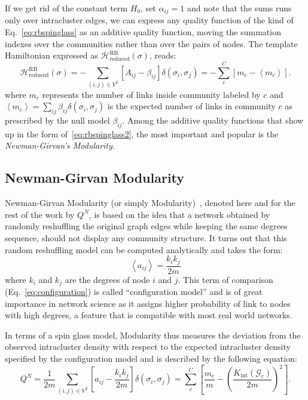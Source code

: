 If we get rid of the constant term $H_0$, set $\alpha_{ij}=1$ and note that the sums runs only over intracluster edges, we can express any quality function of the kind of Eq.~\ref{eq:rbspinglass} as an additive quality function, moving the summation indexes over the communities rather than over the pairs of nodes. The template Hamiltonian expressed as $\mathcal{H}^{\textrm{RB}}_{\textrm{reduced}}(\sigma)$, reads:
\begin{equation}\label{eq:rbspinglass2}
\mathcal{H}^{\textrm{RB}}_{\textrm{reduced}}(\sigma) = -\sum_{(i,j) \in V^2} \left[ A_{ij} - \beta_{ij} \right] \delta(\sigma_i,\sigma_j) = - \sum \limits_{c}^C \left[ m_c - \left< m_c \right> \right].
\end{equation}
where $m_c$ represents the number of links inside community labeled by $c$ and $\left <m_c \right >=\sum_{ij}\beta_{ij}\delta(\sigma_i,\sigma_j)$ is the expected number of links in community $c$ as prescribed by the null model $\beta_{ij}$. 
Among the additive quality functions that show up in the form of~\ref{eq:rbspinglass2}, the most important and popular is the \emph{Newman-Girvan's Modularity}.

\subsection{Newman-Girvan Modularity}
Newman-Girvan Modularity (or simply Modularity)~\cite{newman2006}, denoted here and for the rest of the work by $Q^N$, is based on the idea that a network obtained by randomly reshuffling the original graph edges while keeping the same degrees sequence, should not display any community structure. It turns out that this random reshuffling model can be computed analytically and takes the form:
\begin{equation}\label{eq:configuration_model}
\left< a_{ij} \right > = \frac{k_i k_j}{2m}
\end{equation}
where $k_i$ and $k_j$ are the degrees of node $i$ and $j$. This term of comparison (Eq.~\ref{eq:configuration}) is called ``configuration model'' and is of great importance in network science as it assigns higher probability of link to nodes with high degrees, a feature that is compatible with most real world networks.

In terms of a spin glass model, Modularity thus measures the deviation from the observed intracluster density with respect to the expected intracluster density specified by the configuration model and is described by the following equation:
\begin{equation}\label{eq:newmanmodularityspinglass}
Q^N =  \frac{1}{2m} \sum_{ (i,j) \in V^2} \left[ a_{ij} - \frac{k_i k_j}{2m} \right] \delta(\sigma_i,\sigma_j) = \sum_{c}^{C} \left[ \frac{m_c}{m} - \left( \frac{K_{\textrm{int}}(\mathcal{G}_c)}{2m} \right)^2 \right].
\end{equation}

